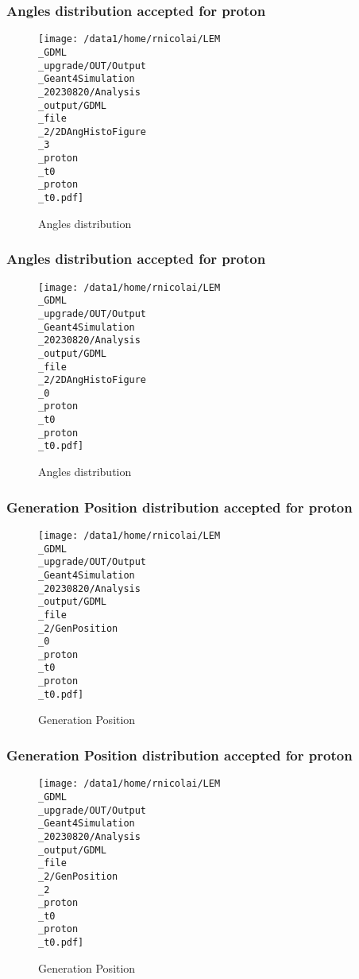 \documentclass[8pt]{beamer}
\begin{document}
            \begin{frame}
                \frametitle{Angles distribution accepted for proton}
            
        \begin{figure}[h]
            \centering
            \texttt{[image: /data1/home/rnicolai/LEM\\\_GDML\\\_upgrade/OUT/Output\\\_Geant4Simulation\\\_20230820/Analysis\\\_output/GDML\\\_file\\\_2/2DAngHistoFigure\\\_3\\\_proton\\\_t0\\\_proton\\\_t0.pdf]}
            \caption{Angles distribution}
        \end{figure}
        
            \end{frame}
            
            \begin{frame}
                \frametitle{Angles distribution accepted for proton}
            
        \begin{figure}[h]
            \centering
            \texttt{[image: /data1/home/rnicolai/LEM\\\_GDML\\\_upgrade/OUT/Output\\\_Geant4Simulation\\\_20230820/Analysis\\\_output/GDML\\\_file\\\_2/2DAngHistoFigure\\\_0\\\_proton\\\_t0\\\_proton\\\_t0.pdf]}
            \caption{Angles distribution}
        \end{figure}
        
            \end{frame}
            
            \begin{frame}
                \frametitle{Generation Position distribution accepted for proton}
            
        \begin{figure}[h]
            \centering
            \texttt{[image: /data1/home/rnicolai/LEM\\\_GDML\\\_upgrade/OUT/Output\\\_Geant4Simulation\\\_20230820/Analysis\\\_output/GDML\\\_file\\\_2/GenPosition\\\_0\\\_proton\\\_t0\\\_proton\\\_t0.pdf]}
            \caption{Generation Position}
        \end{figure}
        
            \end{frame}
            
            \begin{frame}
                \frametitle{Generation Position distribution accepted for proton}
            
        \begin{figure}[h]
            \centering
            \texttt{[image: /data1/home/rnicolai/LEM\\\_GDML\\\_upgrade/OUT/Output\\\_Geant4Simulation\\\_20230820/Analysis\\\_output/GDML\\\_file\\\_2/GenPosition\\\_2\\\_proton\\\_t0\\\_proton\\\_t0.pdf]}
            \caption{Generation Position}
        \end{figure}
        
            \end{frame}
            
\end{document}
